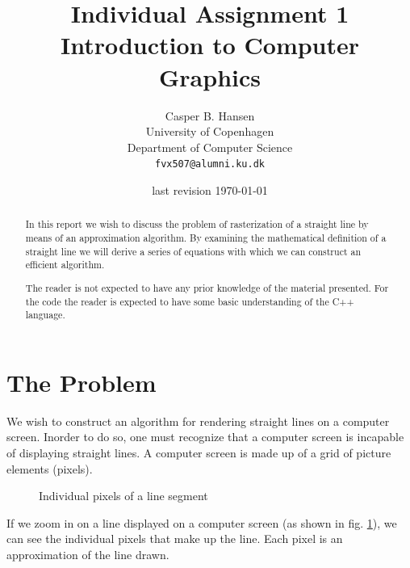 \documentclass[11pt]{article}
\title
{
    {\Large Individual Assignment 1} \\
    Introduction to Computer Graphics
}
\author
{
    Casper B. Hansen \\
    University of Copenhagen \\
    Department of Computer Science \\
    {\tt fvx507@alumni.ku.dk}
}
\date{last revision \today}
\begin{document}
\clearpage\maketitle\vspace{1in}
\begin{multicols}{2}
    \begin{abstract}
        In this report we wish to discuss the problem of rasterization of a
        straight line by means of an approximation algorithm. By examining the
        mathematical definition of a straight line we will derive a series of
        equations with which we can construct an efficient algorithm.
        
        The reader is not expected to have any prior knowledge of the material
        presented. For the code the reader is expected to have some basic
        understanding of the C++ language.
    \end{abstract}
    \vfill\columnbreak
    \tableofcontents
    \vfill
\end{multicols}
\thispagestyle{empty}\newpage

\section{The Problem}
We wish to construct an algorithm for rendering straight lines on a computer
screen. Inorder to do so, one must recognize that a computer screen is
incapable of displaying straight lines. A computer screen is made up of a grid
of picture elements (pixels).

\begin{multicols}{2}

    \begin{figure}[H]
    \center
    \label{fig:pixels}
    \caption{Individual pixels of a line segment}
    \end{figure}
    
    \vfill\columnbreak
    
    \noindent
    If we zoom in on a line displayed on a computer screen (as shown in fig.
    \ref{fig:pixels}), we can see the individual pixels that make up the line.
    Each pixel is an approximation of the line drawn. 
    \vfill
    
\end{multicols}
\end{document}
